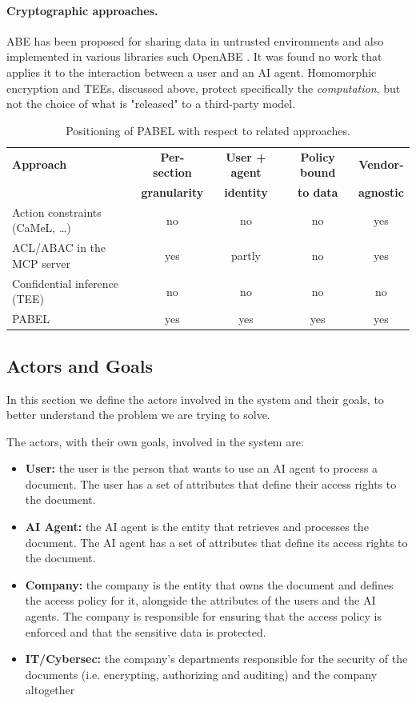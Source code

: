 \paragraph{Cryptographic approaches.}
ABE has been proposed for sharing data in untrusted environments and also implemented in various libraries such OpenABE \cite{openabe}.
It was found no work that applies it to the interaction between a user and an AI agent.
Homomorphic encryption and TEEs, discussed above, protect specifically the \emph{computation}, but not the choice of what is "released" to a third-party model.

\begin{table}[htbp]
  \centering
  \begingroup\linespread{1.0}\small
  \begin{tabular}{@{}lcccc@{}}
    \toprule
    \textbf{Approach} & \textbf{Per-section} & \textbf{User + agent} & \textbf{Policy bound} & \textbf{Vendor-} \\
     & \textbf{granularity} & \textbf{identity} & \textbf{to data} & \textbf{agnostic} \\
    \midrule
    Action constraints (CaMeL, \dots) & no  & no  & no  & yes \\
    ACL/ABAC in the MCP server        & yes & partly & no  & yes \\
    Confidential inference (TEE)      & no  & no  & no  & no  \\
    PABEL                             & yes & yes & yes & yes \\
    \bottomrule
  \end{tabular}
  \endgroup
  \caption{Positioning of PABEL with respect to related approaches.}\label{tab:related}
\end{table}

\subsection{Actors and Goals}
In this section we define the actors involved in the system and their goals, to better understand the problem we are trying to solve.

The actors, with their own goals, involved in the system are:
\begin{itemize}
    \item \textbf{User:} the user is the person that wants to use an AI agent to process a document. The user has a set of attributes that define their access rights to the document.
    \item \textbf{AI Agent:} the AI agent is the entity that retrieves and processes the document. The AI agent has a set of attributes that define its access rights to the document.
    \item \textbf{Company:} the company is the entity that owns the document and defines the access policy for it, alongside the attributes of the users and the AI agents. The company is responsible for ensuring that the access policy is enforced and that the sensitive data is protected.
    \item \textbf{IT/Cybersec:} the company's departments responsible for the security of the documents (i.e. encrypting, authorizing and auditing) and the company altogether
\end{itemize}

